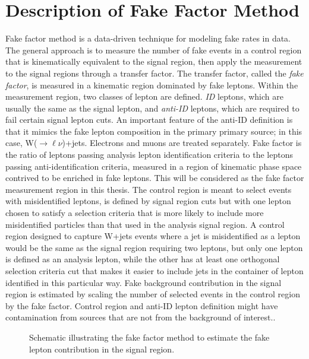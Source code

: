 \section{Description of Fake Factor Method}
\label{sec:FFdesc}
Fake factor method is a data-driven technique for modeling fake rates in data.  The general approach is to measure the number of fake events in a control region that is kinematically equivalent to the signal region, then apply the measurement to the signal regions through a transfer factor.  The transfer factor, called the \textit{fake factor}, is measured in a kinematic region dominated by fake leptons.  Within the measurement region, two classes of lepton are defined.  \textit{ID} leptons, which are usually the same as the signal lepton, and \textit{anti-ID} leptons, which are required to fail certain signal lepton cuts.  An important feature of the anti-ID definition is that it mimics the fake lepton composition in the primary primary source; in this case, W($\rightarrow\ell\nu$)+jets.  Electrons and muons are treated separately.  Fake factor is the ratio of leptons passing analysis lepton identification criteria to the leptons passing anti-identification criteria, measured in a region of kinematic phase space contrived to be enriched in fake leptons.  This will be considered as the fake factor measurement region in this thesis.  The control region is meant to select events with misidentified leptons, is defined by signal region cuts but with one lepton chosen to satisfy a selection criteria that is more likely to include more misidentified particles than that used in the analysis signal region.  A control region designed to capture W+jets events where a jet is misidentified as a lepton would be the same as the signal region requiring two leptons, but only one lepton is defined as an analysis lepton, while the other has at least one orthogonal selection criteria cut that makes it easier to include jets in the container of lepton identified in this particular way.  Fake background contribution in the signal region is estimated by scaling the number of selected events in the control region by the fake factor.  Control region and anti-ID lepton definition might have contamination from sources that are not from the background of interest..

\begin{figure}
\centering
 
 \caption{Schematic illustrating the fake factor method to estimate the fake lepton contribution in the signal region.}
 \label{fig:fake_schematic}
 \end{figure}
 
